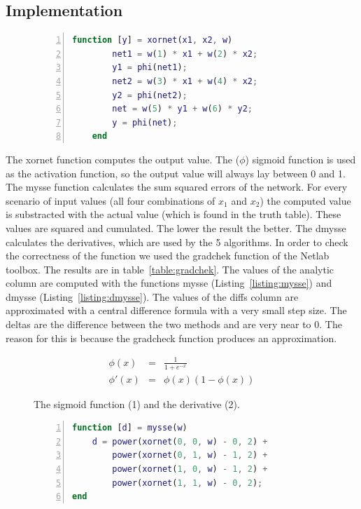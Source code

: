 \documentclass{article}
\begin{document}
\subsection{Implementation}
\begin{figure}[H]
	\begin{lstlisting}[caption={The computation of the output value, based on the input values and the weights.}, captionpos=b, language=matlab, numbers=left, tabsize=4, frame=single, basicstyle=\footnotesize]
	function [y] = xornet(x1, x2, w)
		net1 = w(1) * x1 + w(2) * x2;
	 	y1 = phi(net1);
		net2 = w(3) * x1 + w(4) * x2;
	 	y2 = phi(net2);
		net = w(5) * y1 + w(6) * y2;
	 	y = phi(net);
	end
	\end{lstlisting}
\end{figure}

The xornet function computes the output value. The ($\phi$) sigmoid function is used as the activation function, so the output value will always lay between 0 and 1. The mysse function calculates the sum squared errors of the network. For every scenario of input values (all four combinations of $x_1$ and $x_2$) the computed value is substracted with the actual value (which is found in the truth table). These values are squared and cumulated. The lower the result the better. The dmysse calculates the derivatives, which are used by the 5 algorithms. In order to check the correctness of the function we used the gradchek function of the Netlab toolbox. The results are in table~\ref{table:gradchek}. The values of the analytic column are computed with the functions mysse (Listing~\ref{listing:mysse}) and dmysse (Listing~\ref{listing:dmysse}). The values of the diffs column are approximated with a central difference formula with a very small step size. The deltas are the difference between the two methods and are very near to 0. The reason for this is because the gradcheck function produces an approximation. 

\begin{figure}[H]
	\centering
	\begin{eqnarray}
	 \phi(x) & = & \frac{1}{1 + e^{-x}} \\
	   \phi'(x) & = & \phi(x)(1 - \phi(x))
	\end{eqnarray}
	\caption{The sigmoid function (1) and the derivative (2).}
\end{figure}

\begin{figure}[H]
	\begin{lstlisting}[caption={The calculation of the sum squared error of the weights.}, label={listing:mysse}, captionpos=b, language=matlab, numbers=left, tabsize=4, frame=single, basicstyle=\footnotesize, breaklines=true]
function [d] = mysse(w)
	d = power(xornet(0, 0, w) - 0, 2) + 
		power(xornet(0, 1, w) - 1, 2) + 
		power(xornet(1, 0, w) - 1, 2) + 
		power(xornet(1, 1, w) - 0, 2);
end
	\end{lstlisting}
\end{figure}
\end{document}
